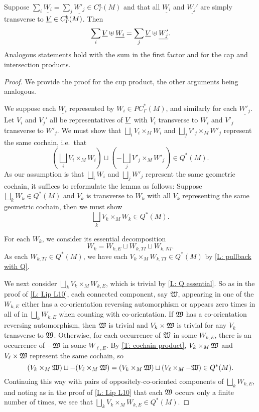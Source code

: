 \begin{proposition}\label{P: multicup}
Suppose $\sum_i \underline{W_i} = \sum_j \underline{W'_j} \in C_\Gamma^a(M)$ and that all $\underline{W_i}$ and $\underline{W_j'}$ are simply transverse to $\underline{V} \in C_\Gamma^b(M)$. Then $$\sum_i \underline{V} \uplus \underline{W_i} = \sum_j \underline{V}\uplus \underline{W'_j}.$$
Analogous statements hold with the sum in the first factor and for the cap and intersection products.
\end{proposition}
\begin{proof}
We provide the proof for the cup product, the other arguments being analogous.

We suppose each $\underline{W_i}$ represented by $W_i \in PC^*_\Gamma(M)$, and similarly for each $\underline{W'_j}$. Let $V_i$ and $V_j'$ all be representatives of $\underline{V}$ with $V_i$ transverse to $W_i$ and $V'_j$ transverse to $W'_j$. We must show that $\bigsqcup_i V_i \times_M W_i$ and $\bigsqcup_j V'_j \times_M W'_j$ represent the same cochain, i.e.\ that $$\left(\bigsqcup_i V_i \times_M W_i\right) \sqcup \left(-\bigsqcup_j V'_j \times_M W'_j\right) \in Q^*(M).$$
As our assumption is that $\bigsqcup_i W_i$ and $\bigsqcup_j W'_j$ represent the same geometric cochain, it suffices to reformulate the lemma as follows: Suppose $\bigsqcup_k W_k \in Q^*(M)$ and $V_k$ is transverse to $W_k$ with all $V_k$ representing the same geometric cochain, then we must show
 $$\bigsqcup_k V_k \times_M W_k \in Q^*(M).$$

For each $W_k$, we consider its essential decomposition $$W_k = W_{k,E} \sqcup W_{k,TI} \sqcup W_{k,NI}.$$
As each $W_{k,TI} \in Q^*(M)$, we have each $V_k \times_M W_{k,TI} \in Q^*(M)$ by \cref{L: pullback with Q}.

We next consider $\bigsqcup_k V_k \times_M W_{k,E}$, which is trivial by \cref{L: Q essential}. So as in the proof of \cref{L: Lip L10}, each connected component, say $\mathfrak W$, appearing in one of the $W_{k,E}$ either has a co-orientation reversing automorphism or appears zero times in all of in $\bigsqcup_k W_{k,E}$ when counting with co-orientation. If $\mathfrak W$ has a co-orientation reversing automorphism, then $\mathfrak W$ is trivial and $V_k \times \mathfrak W$ is trivial for any $V_k$ transverse to $\mathfrak W$. Otherwise, for each occurrence of $\mathfrak W$ in some $W_{k,E}$, there is an occurrence of $-\mathfrak W$ in some $W_{\ell,E}$. By \cref{T: cochain product}, $V_k \times_M \mathfrak W$ and $V_\ell \times \mathfrak W$ represent the same cochain, so
$$(V_k \times_M \mathfrak W) \sqcup -(V_\ell \times_M \mathfrak W) = (V_k \times_M \mathfrak W)\sqcup(V_\ell \times_M -\mathfrak W) \in Q^*(M).$$
Continuing this way with pairs of oppositely-co-oriented components of $\bigsqcup_k W_{k,E}$, and noting as in the proof of \cref{L: Lip L10} that each $\mathfrak W$ occurs only a finite number of times, we see that $\bigsqcup_k V_k \times_M W_{k,E} \in Q^*(M)$.


\end{proof}
